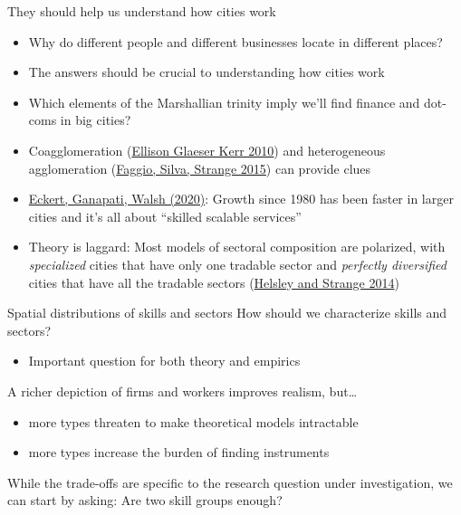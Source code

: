 \documentclass[10pt,notes=hide]{beamer}
\begin{document}
\begin{frame}{They should help us understand how cities work}
\begin{itemize}
	\item Why do different people and different businesses locate in different places?
	\item The answers should be crucial to understanding how cities work
	\item Which elements of the Marshallian trinity imply we'll find finance and dot-coms in big cities?
	\item Coagglomeration (\href{https://www.aeaweb.org/articles.php?doi=10.1257/aer.100.3.1195}{Ellison Glaeser Kerr 2010}) and heterogeneous agglomeration (\href{https://ideas.repec.org/p/ehl/lserod/58426.html}{Faggio, Silva, Strange 2015}) can provide clues
	\item \href{https://papers.ssrn.com/sol3/papers.cfm?abstract_id=3736487}{Eckert, Ganapati, Walsh (2020)}: Growth since 1980 has been faster in larger cities and it's all about ``skilled scalable services''
	\item Theory is laggard: Most models of sectoral composition are polarized, with \emph{specialized} cities that have only one tradable sector and \emph{perfectly diversified} cities that have all the tradable sectors (\href{http://www.jstor.org/stable/10.1086/676557}{Helsley and Strange 2014})
\end{itemize}
\end{frame}
\begin{frame}{Spatial distributions of skills and sectors}
How should we characterize skills and sectors?
\begin{itemize}
	\item Important question for both theory and empirics
\end{itemize}
A richer depiction of firms and workers improves realism, but\dots
\begin{itemize}
	\item more types threaten to make theoretical models intractable
	\item more types increase the burden of finding instruments
\end{itemize}
While the trade-offs are specific to the research question under investigation, we can start by asking: Are two skill groups enough?
\end{frame}
\end{document}

